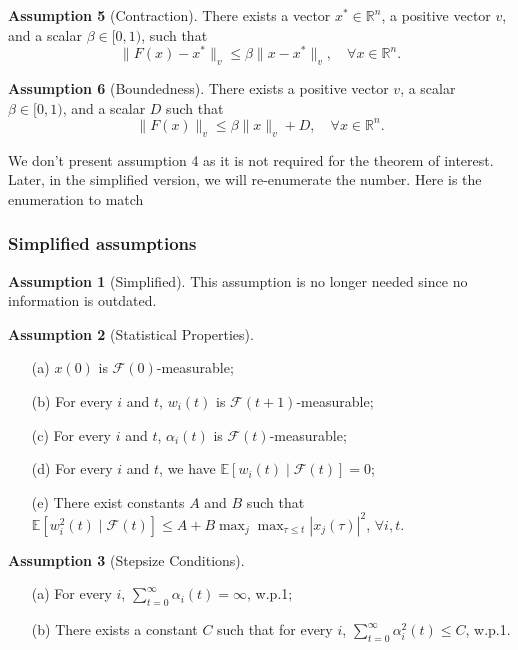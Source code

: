 \vspace{1em}

\noindent
\textbf{Assumption 5} (Contraction).
There exists a vector $x^* \in \mathbb{R}^n$, a positive vector $v$, and a scalar $\beta \in [0,1)$, such that
\begin{equation}
\|F(x) - x^*\|_v \leq \beta \|x - x^*\|_v, \quad \forall x \in \mathbb{R}^n.
\end{equation}

\vspace{1em}

\noindent
\textbf{Assumption 6} (Boundedness).
There exists a positive vector $v$, a scalar $\beta \in [0,1)$, and a scalar $D$ such that
\begin{equation}
\|F(x)\|_v \leq \beta\|x\|_v + D, \quad \forall x \in \mathbb{R}^n.
\end{equation}
\begin{remark}
    We don't present assumption 4 as it is not required for the theorem of interest. Later, in the simplified version, we will re-enumerate the number. Here is the enumeration to match \cite{tsitsiklis1994asynchronous}
\end{remark}
\subsubsection{Simplified assumptions}
\noindent
\textbf{Assumption 1} (Simplified).
This assumption is no longer needed since no information is outdated.
\vspace{1em}

\noindent
\textbf{Assumption 2} (Statistical Properties).
\begin{enumerate}
\item[(a)] $x(0)$ is $\mathcal{F}(0)$-measurable;
\item[(b)] For every $i$ and $t$, $w_i(t)$ is $\mathcal{F}(t+1)$-measurable;
\item[(c)] For every $i$ and $t$, $\alpha_i(t)$ is $\mathcal{F}(t)$-measurable;
\item[(d)] For every $i$ and $t$, we have $\mathbb{E}[w_i(t) \mid \mathcal{F}(t)] = 0$;
\item[(e)] There exist constants $A$ and $B$ such that
$\mathbb{E}[w_i^2(t) \mid \mathcal{F}(t)] \leq A + B \max_j \max_{\tau \leq t} |x_j(\tau)|^2$, $\forall i, t$.
\end{enumerate}

\vspace{1em}

\noindent
\textbf{Assumption 3} (Stepsize Conditions).
\begin{enumerate}
\item[(a)] For every $i$, $\sum_{t=0}^{\infty} \alpha_i(t) = \infty$, w.p.1;
\item[(b)] There exists a constant $C$ such that for every $i$, $\sum_{t=0}^{\infty} \alpha_i^2(t) \leq C$, w.p.1.
\end{enumerate}

